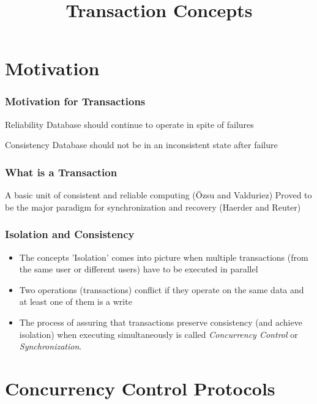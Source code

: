 \documentclass[12]{beamer}
\title{Transaction Concepts}
\date
\begin{document}
\maketitle

\section{Motivation}

\begin{frame}
  \frametitle{Motivation for Transactions}
  \begin{block}{Reliability}
    Database should continue to operate in spite of failures
  \end{block}
  \begin{block}{Consistency}
    Database should not be in an inconsistent state after failure
  \end{block}
\end{frame}

%
%
\begin{frame}
  \frametitle{What is a Transaction}
  \begin{definition}
    A basic unit of consistent and reliable computing (\"Ozsu and Valduriez)
    Proved to be the major paradigm for synchronization and recovery (Haerder and Reuter)
  \end{definition}
\vspace{5mm}
\end{frame}

\begin{frame}
  \frametitle{Isolation and Consistency}
  \begin{itemize}
    \addtolength{\itemsep}{10pt}
    \item   The concepts 'Isolation' comes into picture when multiple transactions (from the same user or different users) have to be executed in parallel
    \item Two operations (transactions) conflict if they operate on the same data and at least one of them is a write
    \item The process of assuring that transactions preserve consistency (and achieve isolation) when executing simultaneously is called \textit{Concurrency Control} or \textit{Synchronization}.
  \end{itemize}
\end{frame}

\section{Concurrency Control Protocols}
\end{document}
